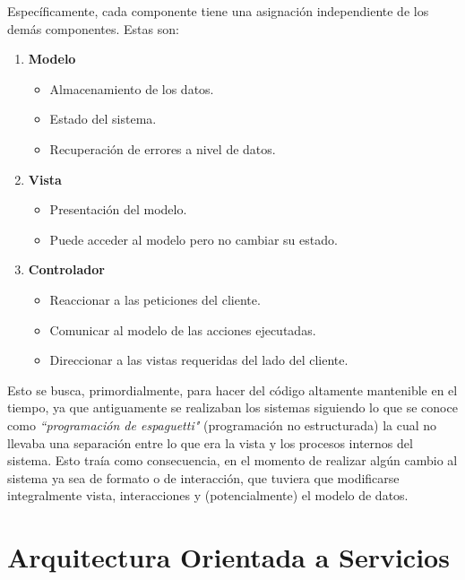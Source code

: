     Específicamente, cada componente tiene una asignación independiente de los demás componentes. Estas son:
    
    \begin{enumerate}
        \item \textbf{Modelo}
            \begin{itemize}
                \item Almacenamiento de los datos.
                \item Estado del sistema.
                \item Recuperación de errores a nivel de datos.
            \end{itemize}
        \item \textbf{Vista}
            \begin{itemize}
                \item Presentación del modelo.
                \item Puede acceder al modelo pero no cambiar su estado.
            \end{itemize}
        \item \textbf{Controlador}
            \begin{itemize}
                \item Reaccionar a las peticiones del cliente.
                \item Comunicar al modelo de las acciones ejecutadas.
                \item Direccionar a las vistas requeridas del lado del cliente.
            \end{itemize}
    \end{enumerate}
    
    Esto se busca, primordialmente, para hacer del código altamente mantenible en el tiempo, ya que antiguamente se realizaban los sistemas siguiendo lo que se conoce como \textit{``programación de espaguetti"} (programación no estructurada) la cual no llevaba una separación entre lo que era la vista y los procesos internos del sistema. Esto traía como consecuencia, en el momento de realizar algún cambio al sistema ya sea de formato o de interacción, que tuviera que modificarse integralmente vista, interacciones y (potencialmente) el modelo de datos.
    
    \section{Arquitectura Orientada a Servicios}
    

